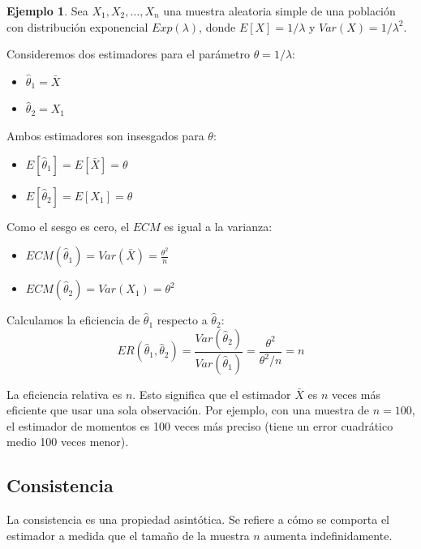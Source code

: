 \documentclass[
  11pt,
]{book}
\providecommand{\tightlist}{%
  \setlength{\itemsep}{0pt}\setlength{\parskip}{0pt}}
\theoremstyle{definition}
\theoremstyle{definition}
\newtheorem{example}{Ejemplo}[chapter]
\theoremstyle{definition}
\theoremstyle{definition}
\theoremstyle{remark}
\begin{document}
\begin{example}
Sea \(X_1, X_2, \dots, X_n\) una muestra aleatoria simple de una población con distribución exponencial \(Exp(\lambda)\), donde \(E[X] = 1/\lambda\) y \(Var(X) = 1/\lambda^2\).

Consideremos dos estimadores para el parámetro \(\theta = 1/\lambda\):

\begin{itemize}
\tightlist
\item
  \(\widehat{\theta}_1 = \bar{X}\)
\item
  \(\widehat{\theta}_2 = X_1\)
\end{itemize}

Ambos estimadores son insesgados para \(\theta\):

\begin{itemize}
\tightlist
\item
  \(E[\hat{\theta}_1] = E[\bar{X}] = \theta\)
\item
  \(E[\hat{\theta}_2] = E[X_1] = \theta\)
\end{itemize}

Como el sesgo es cero, el \(ECM\) es igual a la varianza:

\begin{itemize}
\tightlist
\item
  \(ECM(\widehat{\theta}_1) = Var(\bar{X}) = \frac{\theta^2}{n}\)
\item
  \(ECM(\widehat{\theta}_2) = Var(X_1) = \theta^2\)
\end{itemize}

Calculamos la eficiencia de \(\widehat{\theta}_1\) respecto a \(\widehat{\theta}_2\):
\[ ER(\hat{\theta}_1, \hat{\theta}_2) = \frac{Var(\hat{\theta}_2)}{Var(\hat{\theta}_1)} = \frac{\theta^2}{\theta^2 / n} = n \]

La eficiencia relativa es \(n\). Esto significa que el estimador \(\bar{X}\) es \(n\) veces más eficiente que usar una sola observación. Por ejemplo, con una muestra de \(n=100\), el estimador de momentos es 100 veces más preciso (tiene un error cuadrático medio 100 veces menor).
\end{example}

\subsection{Consistencia}\label{consistencia}

La consistencia es una propiedad asintótica. Se refiere a cómo se comporta el estimador a medida que el tamaño de la muestra \(n\) aumenta indefinidamente.
\end{document}
